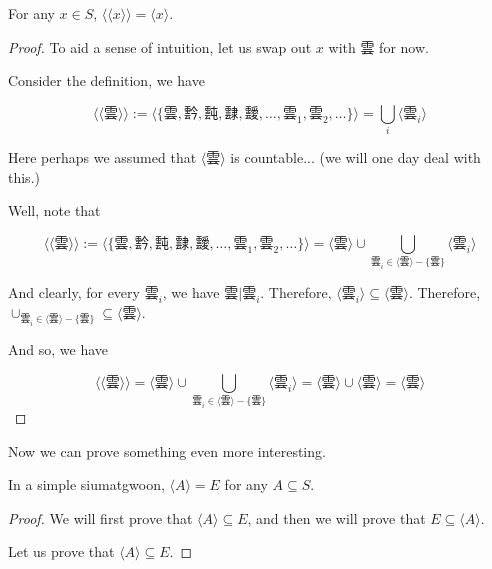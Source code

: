 \begin{theorem}\label{thm:indempotence-of-emergence}
    For any $x\in S$, $\langle \langle x \rangle \rangle = \langle x \rangle$.
\end{theorem}
\begin{proof}
    To aid a sense of intuition, let us swap out $x$ with $\text{雲}$ for now. 

    Consider the definition, we have
    
    $$\langle \langle \text{雲} \rangle \rangle := \langle \{\text{雲}, \text{霒}, \text{霕}, \text{霴}, \text{靉}, \ldots, \text{雲}_{1}, \text{雲}_{2}, \ldots\} \rangle = \bigcup_{i} \langle \text{雲}_{i} \rangle$$ 

    Here perhaps we assumed that $\langle \text{雲} \rangle$ is countable... (we will one day deal with this.)

    Well, note that 

    $$\langle \langle \text{雲} \rangle \rangle := \langle \{\text{雲}, \text{霒}, \text{霕}, \text{霴}, \text{靉}, \ldots, \text{雲}_{1}, \text{雲}_{2}, \ldots\} \rangle = \langle \text{雲} \rangle \cup \bigcup_{\text{雲}_{i}\in 
    \langle \text{雲} \rangle - \{\text{雲}\}} 
     \langle \text{雲}_{i} \rangle$$ 

     And clearly, for every $\text{雲}_{i}$, we have $\text{雲}|\text{雲}_{i}$. Therefore, $\langle \text{雲}_{i} \rangle \subseteq \langle \text{雲} \rangle$. Therefore,$\cup_{\text{雲}_{i}\in 
    \langle \text{雲} \rangle - \{\text{雲}\}} \subseteq \langle \text{雲} \rangle$.
    
And so, we have          
     
    $$\langle \langle \text{雲} \rangle \rangle = 
     \langle \text{雲} \rangle \cup \bigcup_{\text{雲}_{i}\in 
     \langle \text{雲} \rangle - \{\text{雲}\}} 
      \langle \text{雲}_{i} \rangle
       = \langle \text{雲} \rangle \cup \langle \text{雲} \rangle
    =\langle \text{雲} \rangle$$

\end{proof}



Now we can prove something even more interesting. 
\begin{theorem}\label{thm:hais-of-sets-are-siumatgwoons}
    In a simple siumatgwoon, $\langle A \rangle = E$ for any $A\subseteq S$.
\end{theorem}
\begin{proof}
    We will first prove that $\langle A \rangle \subseteq E$, and then we will prove that $E \subseteq \langle A \rangle$.

    Let us prove that $\langle A \rangle \subseteq E$.  


 
\end{proof}
